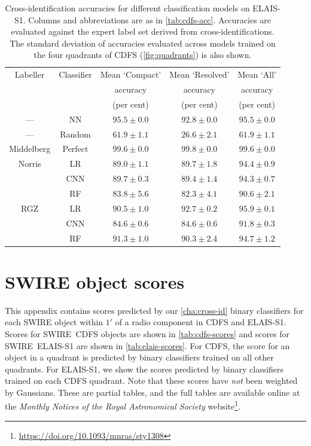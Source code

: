  \begin{table}
    \caption[Cross-identification accuracies for different classification
    models on ELAIS-S1.]{Cross-identification accuracies for different classification
    models on ELAIS-S1. Columns and abbreviations are as in
    \autoref{tab:cdfs-acc}. Accuracies are evaluated against the expert label
    set derived from \citet{middelberg08} cross-identifications. The standard
    deviation of accuracies evaluated across models trained on the four
    quadrants of CDFS (\autoref{fig:quadrants}) is also shown.}
    \label{tab:elais-acc}
    \small\centering
    \begingroup
    \setlength{\tabcolsep}{8pt} %
    \begin{tabular}{ccccc}
      \hline\hline
      Labeller & Classifier & Mean `Compact' & Mean `Resolved' & Mean `All'\\
       &  & accuracy & accuracy & accuracy\\
       &  & (per cent) & (per cent) & (per cent)\\
      \hline
     ---& NN & $95.5 \pm 0.0$ & $92.8 \pm 0.0$ & $95.5 \pm 0.0$\\
     ---& Random & $61.9 \pm 1.1$ & $26.6 \pm 2.1$ & $61.9 \pm 1.1$\\
      Middelberg & Perfect & $99.6 \pm 0.0$ & $99.8 \pm 0.0$ & $99.6 \pm 0.0$\\
      Norris & LR & $89.0 \pm 1.1$ & $89.7 \pm 1.8$ & $94.4 \pm 0.9$\\
             & CNN & $89.7 \pm 0.3$ & $89.4 \pm 1.4$ & $94.3 \pm 0.7$\\
             & RF & $83.8 \pm 5.6$ & $82.3 \pm 4.1$ & $90.6 \pm 2.1$\\
      RGZ & LR & $90.5 \pm 1.0$ & $92.7 \pm 0.2$ & $95.9 \pm 0.1$\\
          & CNN & $84.6 \pm 0.6$ & $84.6 \pm 0.6$ & $91.8 \pm 0.3$\\
          & RF & $91.3 \pm 1.0$ & $90.3 \pm 2.4$ & $94.7 \pm 1.2$\\
      \hline\hline
    \end{tabular}
    \endgroup
  \end{table}

\section{SWIRE object scores}\label{sec:atlas-xid-scores}
  
  This appendix contains scores predicted by our \autoref{cha:cross-id} binary classifiers for each
  SWIRE object within $1'$ of a radio component in CDFS and ELAIS-S1. Scores
  for SWIRE~CDFS objects are shown in \autoref{tab:cdfs-scores} and scores for
  SWIRE~ELAIS-S1 are shown in \autoref{tab:elais-scores}. For CDFS, the score
  for an object in a quadrant is predicted by binary classifiers trained on
  all other quadrants. For ELAIS-S1, we show the scores predicted by binary
  classifiers trained on each CDFS quadrant. Note that these scores have
  \emph{not} been weighted by Gaussians. These are partial tables, and the full tables are available online at the \emph{Monthly Notices of the Royal Astronomical Society} website\footnote{\url{https://doi.org/10.1093/mnras/sty1308}}.

